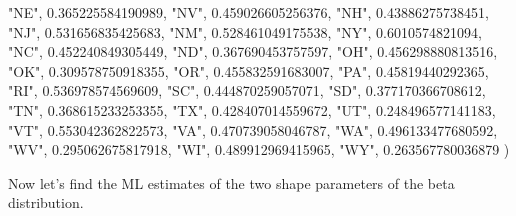 \documentclass[
]{book}
\newenvironment{Shaded}{\begin{snugshade}}{\end{snugshade}}
\newcommand{\FloatTok}[1]{\textcolor[rgb]{0.00,0.00,0.81}{#1}}
\newcommand{\NormalTok}[1]{#1}
\newcommand{\StringTok}[1]{\textcolor[rgb]{0.31,0.60,0.02}{#1}}
\begin{document}
\begin{Shaded}
\begin{Highlighting}[]
         \StringTok{"NE"}\NormalTok{,   }\FloatTok{0.365225584190989}\NormalTok{,}
         \StringTok{"NV"}\NormalTok{,   }\FloatTok{0.459026605256376}\NormalTok{,}
         \StringTok{"NH"}\NormalTok{,    }\FloatTok{0.43886275738451}\NormalTok{,}
         \StringTok{"NJ"}\NormalTok{,   }\FloatTok{0.531656835425683}\NormalTok{,}
         \StringTok{"NM"}\NormalTok{,   }\FloatTok{0.528461049175538}\NormalTok{,}
         \StringTok{"NY"}\NormalTok{,     }\FloatTok{0.6010574821094}\NormalTok{,}
         \StringTok{"NC"}\NormalTok{,   }\FloatTok{0.452240849305449}\NormalTok{,}
         \StringTok{"ND"}\NormalTok{,   }\FloatTok{0.367690453757597}\NormalTok{,}
         \StringTok{"OH"}\NormalTok{,   }\FloatTok{0.456298880813516}\NormalTok{,}
         \StringTok{"OK"}\NormalTok{,   }\FloatTok{0.309578750918355}\NormalTok{,}
         \StringTok{"OR"}\NormalTok{,   }\FloatTok{0.455832591683007}\NormalTok{,}
         \StringTok{"PA"}\NormalTok{,    }\FloatTok{0.45819440292365}\NormalTok{,}
         \StringTok{"RI"}\NormalTok{,   }\FloatTok{0.536978574569609}\NormalTok{,}
         \StringTok{"SC"}\NormalTok{,   }\FloatTok{0.444870259057071}\NormalTok{,}
         \StringTok{"SD"}\NormalTok{,   }\FloatTok{0.377170366708612}\NormalTok{,}
         \StringTok{"TN"}\NormalTok{,   }\FloatTok{0.368615233253355}\NormalTok{,}
         \StringTok{"TX"}\NormalTok{,   }\FloatTok{0.428407014559672}\NormalTok{,}
         \StringTok{"UT"}\NormalTok{,   }\FloatTok{0.248496577141183}\NormalTok{,}
         \StringTok{"VT"}\NormalTok{,   }\FloatTok{0.553042362822573}\NormalTok{,}
         \StringTok{"VA"}\NormalTok{,   }\FloatTok{0.470739058046787}\NormalTok{,}
         \StringTok{"WA"}\NormalTok{,   }\FloatTok{0.496133477680592}\NormalTok{,}
         \StringTok{"WV"}\NormalTok{,   }\FloatTok{0.295062675817918}\NormalTok{,}
         \StringTok{"WI"}\NormalTok{,   }\FloatTok{0.489912969415965}\NormalTok{,}
         \StringTok{"WY"}\NormalTok{,   }\FloatTok{0.263567780036879}
\NormalTok{  )}
\end{Highlighting}
\end{Shaded}

Now let's find the ML estimates of the two shape parameters of the beta distribution.
\end{document}
